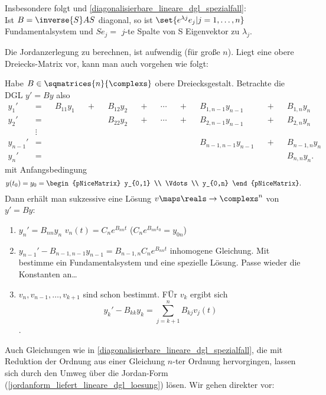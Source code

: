 \begin{bemerkung*}
  Insbesondere folgt  und \ref{diagonalisierbare_lineare_dgl_spezialfall}:\\
  Ist \( B=\inverse{S}AS \) diagonal, so ist \( \set{e^{\lambda j} e_j|j=1,\dotsc, n} \) Fundamentalsystem und \( S e_j= \) \( j \)-te Spalte von S \teq Eigenvektor zu \( \lambda_j \).

  Die Jordanzerlegung zu berechnen, ist aufwendig (für große \( n \)). Liegt eine obere Dreiecks-Matrix vor, kann man auch vorgehen wie folgt:
\end{bemerkung*}
\begin{bemerkung}
  Habe \( B\in \sqmatrices{n}{\complexs} \) obere Dreiecksgestalt. Betrachte die DGL \( y'=By \) also
  \begin{align*}
    y_1'&=&&B_{11}y_1&&+&&B_{12}y_2&&+&&\dotsb&&+&&B_{1,n-1}y_{n-1}&&+&&B_{1,n}y_n\\
    y_2'&=&&&&&&B_{22}y_2&&+&&\dotsb&&+&&B_{2,n-1}y_{n-1}&&+&&B_{2,n}y_n\\
    &\vdots\\
    y_{n-1}'&=&&&&&&&&&&&&&&B_{n-1,n-1}y_{n-1}&&+&&B_{n-1,n}y_n\\
    y_n'&=&&&&&&&&&&&&&&&&&&B_{n,n}y_n.
  \end{align*}
  mit Anfangsbedingung
  \begin{equation*}
    y(t_0)=y_0=\begin{pNiceMatrix} y_{0,1} \\ \Vdots \\ y_{0,n} \end{pNiceMatrix}.
  \end{equation*}
  Dann erhält man sukzessive eine Lösung \( v\maps \reals\to \complexs^n \) von \( y'=By \):
  \begin{enumerate}[label=\rechtsklammer{\arabic*}]
    \item \( y_n'=B_{nn}y_n \) \timplies \( v_n(t)=C_n e^{B_{nn}t} \) (\( C_n e^{B_{nn}t_0}=y_{0n} \))
    \item \( y_{n-1}'-B_{n-1,n-1}y_{n-1}=B_{n-1,n}C_n e^{B_{nn}t} \) inhomogene Gleichung. Mit  bestimme ein Fundamentalsystem und eine spezielle Lösung. Passe wieder die Konstanten an\dots
    \item[\rechtsklammer{k}] \( v_n, v_{n-1},\dotsc, v_{k+1} \) sind schon bestimmt. FÜr \( v_k \) ergibt sich
    \begin{equation*}
      y_k'-B_{kk}y_k=\sum_{j=k+1}^{n}B_{kj}v_j(t)
    \end{equation*}
    \usf.
  \end{enumerate}
  Auch Gleichungen wie in \ref{diagonalisierbare_lineare_dgl_spezialfall}, die mit Reduktion der Ordnung aus einer Gleichung \( n \)-ter Ordnung hervorgingen, lassen sich durch den Umweg über die Jordan-Form (\ref{jordanform_liefert_lineare_dgl_loesung}) lösen. Wir gehen direkter vor:
\end{bemerkung}
